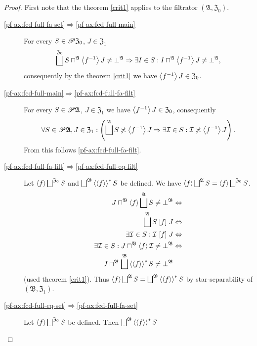 \begin{proof}
First note that the theorem \ref{crit1} applies to the filtrator
$(\mathfrak{A},\mathfrak{Z}_{0})$.
\begin{description}
\item [{\ref{pf-ax:fcd-full-fa-set}$\Rightarrow$\ref{pf-ax:fcd-full-main}}] For
every $S\in\mathscr{P}\mathfrak{Z}_{0}$, $J\in\mathfrak{Z}_{1}$ 
\begin{equation}
\bigsqcup^{\mathfrak{Z}_{0}}S\sqcap^{\mathfrak{A}}\supfun{f^{-1}}J\neq\bot^{\mathfrak{A}}\Rightarrow\exists I\in S:I\sqcap^{\mathfrak{A}}\supfun{f^{-1}}J\neq\bot^{\mathfrak{A}},\label{eq:fcd-full-ee}
\end{equation}
consequently by the theorem \ref{crit1} we have $\left\langle f^{-1}\right\rangle J\in\mathfrak{Z}_{0}$.
\item [{\ref{pf-ax:fcd-full-main}$\Rightarrow$\ref{pf-ax:fcd-full-fa-filt}}] For
every $S\in\mathscr{P}\mathfrak{A}$, $J\in\mathfrak{Z}_{1}$ we have
$\left\langle f^{-1}\right\rangle J\in\mathfrak{Z}_{0}$, consequently 
\[
\forall S\in\subsets\mathfrak{A},J\in\mathfrak{Z}_{1}:\left(\bigsqcup^{\mathfrak{A}}S\nasymp\supfun{f^{-1}}J\Rightarrow\exists\mathcal{I}\in S:\mathcal{I}\nasymp\supfun{f^{-1}}J\right).
\]
From this follows \ref{pf-ax:fcd-full-fa-filt}.
\item [{\ref{pf-ax:fcd-full-fa-filt}$\Rightarrow$\ref{pf-ax:fcd-full-eq-filt}}] Let
$\supfun f\bigsqcup^{\mathfrak{Z}_{0}}S$ and $\bigsqcup^{\mathfrak{B}}\rsupfun{\supfun f}S$
be defined. We have $\supfun f\bigsqcup^{\mathfrak{A}}S=\supfun f\bigsqcup^{\mathfrak{Z}_{0}}S$.
\begin{align*}
J\sqcap^{\mathfrak{B}}\supfun f\bigsqcup^{\mathfrak{A}}S\ne\bot^{\mathfrak{B}} & \Leftrightarrow\\
\bigsqcup^{\mathfrak{A}}S\suprel fJ & \Leftrightarrow\\
\exists\mathcal{I}\in S:\mathcal{I}\suprel fJ & \Leftrightarrow\\
\exists\mathcal{I}\in S:J\sqcap^{\mathfrak{B}}\supfun f\mathcal{I}\ne\bot^{\mathfrak{B}} & \Leftrightarrow\\
J\sqcap^{\mathfrak{B}}\bigsqcup^{\mathfrak{B}}\rsupfun{\supfun f}S\ne\bot^{\mathfrak{B}}
\end{align*}
(used theorem \ref{crit1}). Thus $\supfun f\bigsqcup^{\mathfrak{A}}S=\bigsqcup^{\mathfrak{B}}\rsupfun{\supfun f}S$
by star-separability of $(\mathfrak{B},\mathfrak{Z}_{1})$.
\item [{\ref{pf-ax:fcd-full-eq-set}$\Rightarrow$\ref{pf-ax:fcd-full-fa-set}}] Let
$\supfun f\bigsqcup^{\mathfrak{Z}_{0}}S$ be defined. Then $\bigsqcup^{\mathfrak{B}}\rsupfun{\supfun f}S$

\end{description}
\end{proof}
